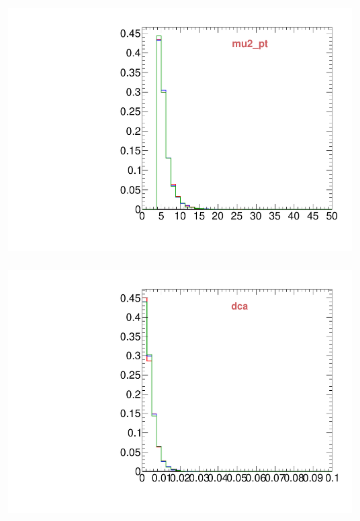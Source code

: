 \begin{figure}
\begin{subfigure}[b]{0.2\textwidth}
                \includegraphics[width=\textwidth]{Figures/VariablesComparison/MC_endcaps_figs_3h/mu2_pt}
                \label{fig:MC_endcaps_mu2_pt_3h}
        \end{subfigure}
        \begin{subfigure}[b]{0.2\textwidth}
                \centering
                \includegraphics[width=\textwidth]{Figures/VariablesComparison/MC_endcaps_figs_3h/dca}
                \label{fig:MC_endcaps_dca_3h}
        \end{subfigure}
        \begin{subfigure}[b]{0.2\textwidth}
                \centering

\end{subfigure}
\end{figure}
